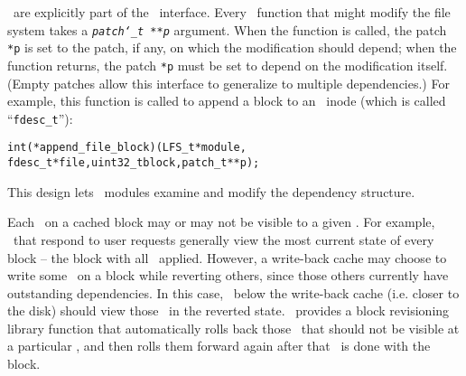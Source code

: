 \Patches\ are explicitly part of the \LFS\ interface.
%
Every \LFS\ function that might modify the file system takes a
\texttt{\textit{patch\char`\_t **p}} argument.
%
When the function is called, the patch \texttt{*p} is set to the patch, if
any, on which the modification should depend;
%
when the function returns, the patch \texttt{*p} must be set to depend on
the modification itself.
%
(Empty patches allow this interface to generalize to multiple
dependencies.)
%
For example, this function is called to append a block to an \LFS\ inode
(which is called ``\verb+fdesc_t+''):

\begin{small}
\begin{alltt}
int (*append_file_block)(LFS_t *module, 
   fdesc_t *file, uint32_t block, patch_t **p);
\end{alltt}
\end{small}

\noindent%
This design lets \LFS\ modules examine and modify the dependency structure.


Each \chdesc\ on a cached block may or may not be visible to a given \module.
For example, \modules\ that respond to user requests generally view the most
current state of every block -- the block with all \chdescs\ applied. However, a
write-back cache may choose to write some \chdescs\ on a block while reverting
others, since those others currently have outstanding dependencies. In this
case, \modules\ below the write-back cache (i.e. closer to the disk) should view
those \chdescs\ in the reverted state. \Kudos\ provides a block revisioning
library function that automatically rolls back those \chdescs\ that should not
be visible at a particular \module, and then rolls them forward again after that
\module\ is done with the block.
